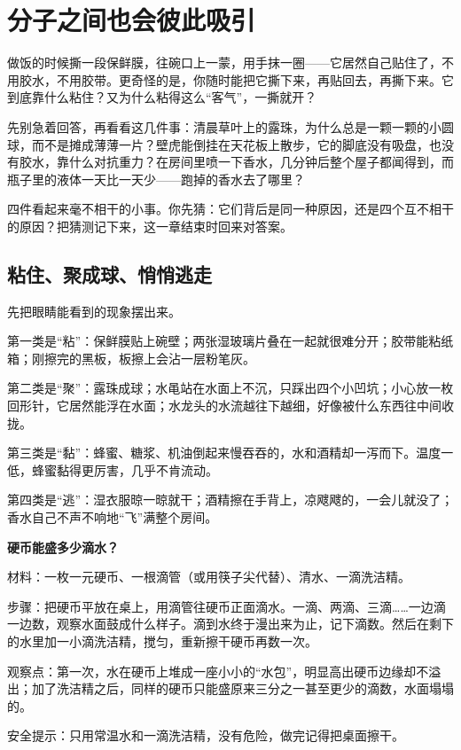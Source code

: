 \chapter{分子之间也会彼此吸引}

\begin{kaichang}
做饭的时候撕一段保鲜膜，往碗口上一蒙，用手抹一圈——它居然自己贴住了，不用胶水，不用胶带。更奇怪的是，你随时能把它撕下来，再贴回去，再撕下来。它到底靠什么粘住？又为什么粘得这么“客气”，一撕就开？

先别急着回答，再看看这几件事：清晨草叶上的露珠，为什么总是一颗一颗的小圆球，而不是摊成薄薄一片？壁虎能倒挂在天花板上散步，它的脚底没有吸盘，也没有胶水，靠什么对抗重力？在房间里喷一下香水，几分钟后整个屋子都闻得到，而瓶子里的液体一天比一天少——跑掉的香水去了哪里？

四件看起来毫不相干的小事。你先猜：它们背后是同一种原因，还是四个互不相干的原因？把猜测记下来，这一章结束时回来对答案。
\end{kaichang}

\section{粘住、聚成球、悄悄逃走}

先把眼睛能看到的现象摆出来。

第一类是“粘”：保鲜膜贴上碗壁；两张湿玻璃片叠在一起就很难分开；胶带能粘纸箱；刚擦完的黑板，板擦上会沾一层粉笔灰。

第二类是“聚”：露珠成球；水黾站在水面上不沉，只踩出四个小凹坑；小心放一枚回形针，它居然能浮在水面；水龙头的水流越往下越细，好像被什么东西往中间收拢。

第三类是“黏”：蜂蜜、糖浆、机油倒起来慢吞吞的，水和酒精却一泻而下。温度一低，蜂蜜黏得更厉害，几乎不肯流动。

第四类是“逃”：湿衣服晾一晾就干；酒精擦在手背上，凉飕飕的，一会儿就没了；香水自己不声不响地“飞”满整个房间。

\begin{shiyan}
\textbf{硬币能盛多少滴水？}

材料：一枚一元硬币、一根滴管（或用筷子尖代替）、清水、一滴洗洁精。

步骤：把硬币平放在桌上，用滴管往硬币正面滴水。一滴、两滴、三滴……一边滴一边数，观察水面鼓成什么样子。滴到水终于漫出来为止，记下滴数。然后在剩下的水里加一小滴洗洁精，搅匀，重新擦干硬币再数一次。

观察点：第一次，水在硬币上堆成一座小小的“水包”，明显高出硬币边缘却不溢出；加了洗洁精之后，同样的硬币只能盛原来三分之一甚至更少的滴数，水面塌塌的。

安全提示：只用常温水和一滴洗洁精，没有危险，做完记得把桌面擦干。
\end{shiyan}

